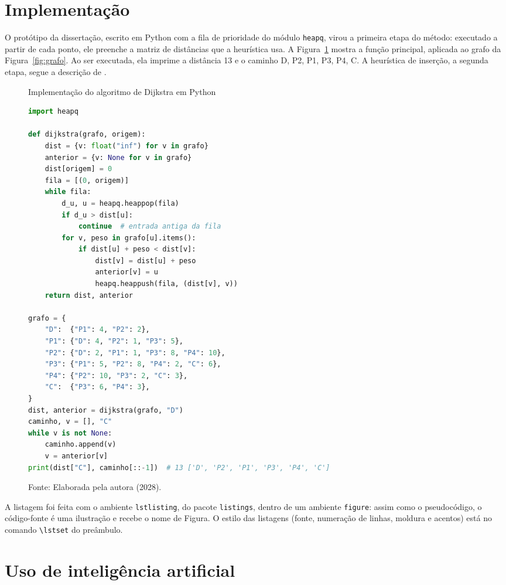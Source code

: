 \documentclass[eq,capa]{texufpel}
\begin{document}
\section{Implementação}

O protótipo da dissertação, escrito em Python com a fila de prioridade do
módulo \texttt{heapq}, virou a primeira etapa do método: executado a partir
de cada ponto, ele preenche a matriz de distâncias que a heurística usa. A
Figura~\ref{fig:codigo} mostra a função principal, aplicada ao grafo da
Figura~\ref{fig:grafo}. Ao ser executada, ela imprime a distância 13 e o
caminho D, P2, P1, P3, P4, C. A heurística de inserção, a segunda etapa,
segue a descrição de \citet{Solomon:1987:AVR}.

\begin{figure}[htbp]
  \caption{Implementação do algoritmo de Dijkstra em Python}
  \label{fig:codigo}
\begin{lstlisting}[language=Python]
import heapq

def dijkstra(grafo, origem):
    dist = {v: float("inf") for v in grafo}
    anterior = {v: None for v in grafo}
    dist[origem] = 0
    fila = [(0, origem)]
    while fila:
        d_u, u = heapq.heappop(fila)
        if d_u > dist[u]:
            continue  # entrada antiga da fila
        for v, peso in grafo[u].items():
            if dist[u] + peso < dist[v]:
                dist[v] = dist[u] + peso
                anterior[v] = u
                heapq.heappush(fila, (dist[v], v))
    return dist, anterior

grafo = {
    "D":  {"P1": 4, "P2": 2},
    "P1": {"D": 4, "P2": 1, "P3": 5},
    "P2": {"D": 2, "P1": 1, "P3": 8, "P4": 10},
    "P3": {"P1": 5, "P2": 8, "P4": 2, "C": 6},
    "P4": {"P2": 10, "P3": 2, "C": 3},
    "C":  {"P3": 6, "P4": 3},
}
dist, anterior = dijkstra(grafo, "D")
caminho, v = [], "C"
while v is not None:
    caminho.append(v)
    v = anterior[v]
print(dist["C"], caminho[::-1])  # 13 ['D', 'P2', 'P1', 'P3', 'P4', 'C']
\end{lstlisting}
  \caption*{Fonte: Elaborada pela autora (2028).}
\end{figure}

A listagem foi feita com o ambiente \texttt{lstlisting}, do pacote
\texttt{listings}, dentro de um ambiente \texttt{figure}: assim como o
pseudocódigo, o código-fonte é uma ilustração e recebe o nome de Figura. O
estilo das listagens (fonte, numeração de linhas, moldura e acentos) está no
comando \verb|\lstset| do preâmbulo.

\section{Uso de inteligência artificial}
\end{document}
